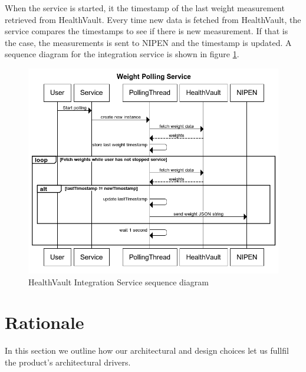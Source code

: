 When the service is started, it the timestamp of the last weight measurement retrieved from HealthVault.
Every time new data is fetched from HealthVault, the service compares the timestamps to see if there is new measurement.
If that is the case, the measurements is sent to NIPEN and the timestamp is updated.
A sequence diagram for the integration service is shown in figure \ref{figure:weight-polling-service}.

\begin{figure}[h]
\centering
\includegraphics[scale=0.8]{../Figures/weight-polling-service.png}
\caption{HealthVault Integration Service sequence diagram}
\label{figure:weight-polling-service}
\end{figure}

\section{Rationale}

In this section we outline how our architectural and design choices let us fullfil
the product's architectural drivers.

